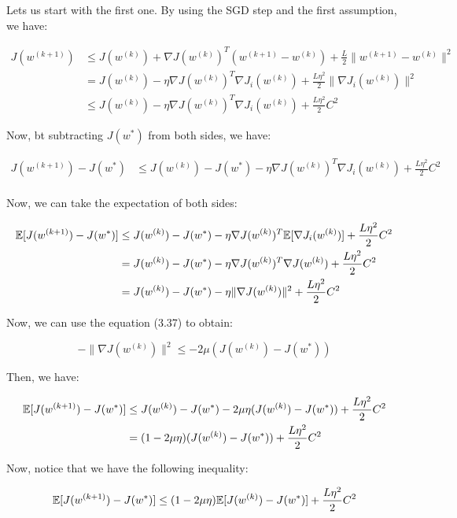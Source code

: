 Lets us start with the first one. By using the SGD step and the first assumption, we have:

\begin{align*}
    J(w^{(k+1)}) &\leq J(w^{(k)}) + \nabla J(w^(k))^T (w^{(k+1)} - w^{(k)}) + \frac{L}{2} \|w^{(k+1)} - w^{(k)}\|^2\\
                 &= J(w^{(k)}) - \eta \nabla J(w^{(k)})^T \nabla J_i(w^{(k)}) + \frac{L \eta^2}{2} \| \nabla J_i(w^{(k)}) \|^2\\
                 &\leq J(w^{(k)}) - \eta \nabla J(w^{(k)})^T \nabla J_i(w^{(k)}) + \frac{L \eta^2}{2} C^2
\end{align*}

Now, bt subtracting $J(w^*)$ from both sides, we have:

\begin{align*}
    J(w^{(k+1)}) - J(w^*) &\leq J(w^{(k)}) - J(w^*) - \eta \nabla J(w^{(k)})^T \nabla J_i(w^{(k)}) + \frac{L \eta^2}{2} C^2\\
\end{align*}

Now, we can take the expectation of both sides:

\begin{align*}
    \mathbb{E}[J(w^{(k+1)}) - J(w^*)] &\leq J(w^{(k)}) - J(w^*) - \eta \nabla J(w^{(k)})^T \mathbb{E}[\nabla J_i(w^{(k)})] + \frac{L \eta^2}{2} C^2\\
                              &= J(w^{(k)}) - J(w^*) - \eta \nabla J(w^{(k)})^T \nabla J(w^{(k)}) + \frac{L \eta^2}{2} C^2\\
                              &= J(w^{(k)}) - J(w^*) - \eta \| \nabla J(w^{(k)}) \|^2 + \frac{L \eta^2}{2} C^2
\end{align*}

Now, we can use the equation (3.37) to obtain:

$$- \| \nabla J(w^{(k)}) \|^2 \leq - 2 \mu (J(w^{(k)}) - J(w^*))$$

Then, we have:

\begin{align*}
    \mathbb{E}[J(w^{(k+1)}) - J(w^*)] &\leq J(w^{(k)}) - J(w^*) - 2 \mu \eta (J(w^{(k)}) - J(w^*)) + \frac{L \eta^2}{2} C^2\\
                              &= (1 - 2 \mu \eta) (J(w^{(k)}) - J(w^*)) + \frac{L \eta^2}{2} C^2
\end{align*}

Now, notice that we have the following inequality:

$$\mathbb{E}[J(w^{(k+1)}) - J(w^*)] \leq (1 - 2 \mu \eta) \mathbb{E}[J(w^{(k)}) - J(w^*)] + \frac{L \eta^2}{2} C^2$$


